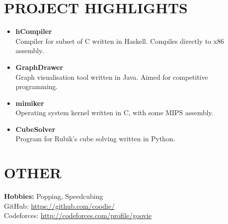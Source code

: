 \documentclass[line,overlapped]{res}
\begin{document}
\begin{resume}
\section{PROJECT HIGHLIGHTS}
\begin{itemize}
\item
{
	\textbf{hCompiler} \\
	Compiler for subset of C written in Haskell. Compiles directly to x86 assembly.
}
\item
{
	\textbf{GraphDrawer} \\
	Graph visualisation tool written in Java. Aimed for competitive programming.
}
\item
{
	\textbf{mimiker} \\
	Operating system kernel written in C, with some MIPS assembly.
}
\item
{
	\textbf{CubeSolver} \\
	Program for Rubik's cube solving written in Python. 
}
\end{itemize}

\section{OTHER}
\textbf{Hobbies:} Popping, Speedcubing \\
GitHub: \url{https://github.com/coodie/}\\
Codeforces: \url{http://codeforces.com/profile/goovie}

\vfill

\end{resume}
\end{document}
